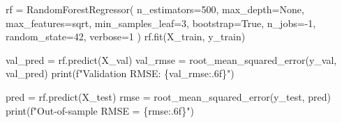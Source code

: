 \documentclass[
  letterpaper,
  DIV=11,
  numbers=noendperiod]{scrartcl}
\newenvironment{Shaded}{\begin{snugshade}}{\end{snugshade}}
\newcommand{\BuiltInTok}[1]{\textcolor[rgb]{0.00,0.23,0.31}{#1}}
\newcommand{\DecValTok}[1]{\textcolor[rgb]{0.68,0.00,0.00}{#1}}
\newcommand{\NormalTok}[1]{\textcolor[rgb]{0.00,0.23,0.31}{#1}}
\newcommand{\OperatorTok}[1]{\textcolor[rgb]{0.37,0.37,0.37}{#1}}
\newcommand{\SpecialCharTok}[1]{\textcolor[rgb]{0.37,0.37,0.37}{#1}}
\newcommand{\SpecialStringTok}[1]{\textcolor[rgb]{0.13,0.47,0.30}{#1}}
\newcommand{\StringTok}[1]{\textcolor[rgb]{0.13,0.47,0.30}{#1}}
\newcommand{\VariableTok}[1]{\textcolor[rgb]{0.07,0.07,0.07}{#1}}
\begin{document}
\begin{Shaded}
\begin{Highlighting}[]
\NormalTok{rf }\OperatorTok{=}\NormalTok{ RandomForestRegressor(}
\NormalTok{    n\_estimators}\OperatorTok{=}\DecValTok{500}\NormalTok{,}
\NormalTok{    max\_depth}\OperatorTok{=}\VariableTok{None}\NormalTok{,}
\NormalTok{    max\_features}\OperatorTok{=}\StringTok{\textquotesingle{}sqrt\textquotesingle{}}\NormalTok{,}
\NormalTok{    min\_samples\_leaf}\OperatorTok{=}\DecValTok{3}\NormalTok{,}
\NormalTok{    bootstrap}\OperatorTok{=}\VariableTok{True}\NormalTok{,}
\NormalTok{    n\_jobs}\OperatorTok{={-}}\DecValTok{1}\NormalTok{,}
\NormalTok{    random\_state}\OperatorTok{=}\DecValTok{42}\NormalTok{,}
\NormalTok{    verbose}\OperatorTok{=}\DecValTok{1}
\NormalTok{)}
\NormalTok{rf.fit(X\_train, y\_train)}
\end{Highlighting}
\end{Shaded}

\begin{Shaded}
\begin{Highlighting}[]
\NormalTok{val\_pred  }\OperatorTok{=}\NormalTok{ rf.predict(X\_val)}
\NormalTok{val\_rmse  }\OperatorTok{=}\NormalTok{ root\_mean\_squared\_error(y\_val, val\_pred)}
\BuiltInTok{print}\NormalTok{(}\SpecialStringTok{f"Validation RMSE: }\SpecialCharTok{\{}\NormalTok{val\_rmse}\SpecialCharTok{:.6f\}}\SpecialStringTok{"}\NormalTok{)}
\end{Highlighting}
\end{Shaded}

\begin{Shaded}
\begin{Highlighting}[]
\NormalTok{pred }\OperatorTok{=}\NormalTok{ rf.predict(X\_test)}
\NormalTok{rmse }\OperatorTok{=}\NormalTok{ root\_mean\_squared\_error(y\_test, pred)}
\BuiltInTok{print}\NormalTok{(}\SpecialStringTok{f"Out{-}of{-}sample RMSE = }\SpecialCharTok{\{}\NormalTok{rmse}\SpecialCharTok{:.6f\}}\SpecialStringTok{"}\NormalTok{)}
\end{Highlighting}
\end{Shaded}
\end{document}
